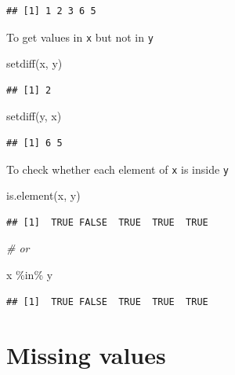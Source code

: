 \documentclass[
]{book}
\newenvironment{Shaded}{\begin{snugshade}}{\end{snugshade}}
\newcommand{\CommentTok}[1]{\textcolor[rgb]{0.56,0.35,0.01}{\textit{#1}}}
\newcommand{\FunctionTok}[1]{\textcolor[rgb]{0.00,0.00,0.00}{#1}}
\newcommand{\NormalTok}[1]{#1}
\newcommand{\SpecialCharTok}[1]{\textcolor[rgb]{0.00,0.00,0.00}{#1}}
\theoremstyle{definition}
\theoremstyle{definition}
\theoremstyle{definition}
\theoremstyle{definition}
\theoremstyle{remark}
\begin{document}
\begin{verbatim}
## [1] 1 2 3 6 5
\end{verbatim}

To get values in \texttt{x} but not in \texttt{y}

\begin{Shaded}
\begin{Highlighting}[]
\FunctionTok{setdiff}\NormalTok{(x, y)}
\end{Highlighting}
\end{Shaded}

\begin{verbatim}
## [1] 2
\end{verbatim}

\begin{Shaded}
\begin{Highlighting}[]
\FunctionTok{setdiff}\NormalTok{(y, x)}
\end{Highlighting}
\end{Shaded}

\begin{verbatim}
## [1] 6 5
\end{verbatim}

To check whether each element of \texttt{x} is inside \texttt{y}

\begin{Shaded}
\begin{Highlighting}[]
\FunctionTok{is.element}\NormalTok{(x, y)}
\end{Highlighting}
\end{Shaded}

\begin{verbatim}
## [1]  TRUE FALSE  TRUE  TRUE  TRUE
\end{verbatim}

\begin{Shaded}
\begin{Highlighting}[]
\CommentTok{\# or}

\NormalTok{x }\SpecialCharTok{\%in\%}\NormalTok{ y}
\end{Highlighting}
\end{Shaded}

\begin{verbatim}
## [1]  TRUE FALSE  TRUE  TRUE  TRUE
\end{verbatim}

\hypertarget{missing-values}{%
\section{Missing values}\label{missing-values}}
\end{document}
